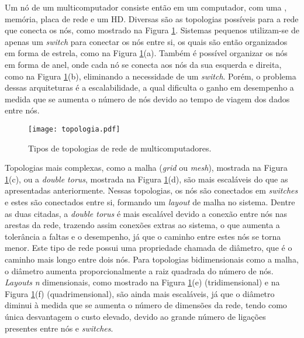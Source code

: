 Um nó de um multicomputador consiste então em um computador, com uma \CPU, memória, placa de rede e um HD. Diversas são as topologias possíveis para a rede que conecta os nós, como mostrado na Figura \ref{fig:topologiamulticomputadores}. Sistemas pequenos utilizam-se de apenas um \textit{switch} para conectar os nós entre si, os quais são então organizados em forma de estrela, como na Figura \ref{fig:topologiamulticomputadores}(a). Também é possível organizar os nós em forma de anel, onde cada nó se conecta aos nós da sua esquerda e direita, como na Figura \ref{fig:topologiamulticomputadores}(b), eliminando a necessidade de um \textit{switch}. Porém, o problema dessas arquiteturas é a escalabilidade, a qual dificulta o ganho em desempenho a medida que se aumenta o número de nós devido ao tempo de viagem dos dados entre nós.

\begin{figure}[tb]
  \centering
  \caption{Tipos de topologias de rede de multicomputadores.}
  \label{fig:topologiamulticomputadores}
  \texttt{[image: topologia.pdf]}
\end{figure}

Topologias mais complexas, como a malha (\textit{grid} ou \textit{mesh}), mostrada na Figura \ref{fig:topologiamulticomputadores}(c), ou a \textit{double torus}, mostrada na Figura \ref{fig:topologiamulticomputadores}(d), são mais escaláveis do que as apresentadas anteriormente. Nessas topologias, os nós são conectados em \textit{switches} e estes são conectados entre si, formando um \textit{layout} de malha no sistema. Dentre as duas citadas, a \textit{double torus} é mais escalável devido a conexão entre nós nas arestas da rede, trazendo assim conexões extras ao sistema, o que aumenta a tolerância a faltas e o desempenho, já que o caminho entre estes nós se torna menor. Este tipo de rede possui uma propriedade chamada de diâmetro, que é o caminho mais longo entre dois nós. Para topologias bidimensionais como a malha, o diâmetro aumenta proporcionalmente a raiz quadrada do número de nós. \textit{Layouts} \textit{n} dimensionais, como mostrado na Figura \ref{fig:topologiamulticomputadores}(e) (tridimensional) e na Figura \ref{fig:topologiamulticomputadores}(f) (quadrimensional), são ainda mais escaláveis, já que o diâmetro diminui à medida que se aumenta o número de dimensões da rede, tendo como única desvantagem o custo elevado, devido ao grande número de ligações presentes entre nós e \textit{switches}.

